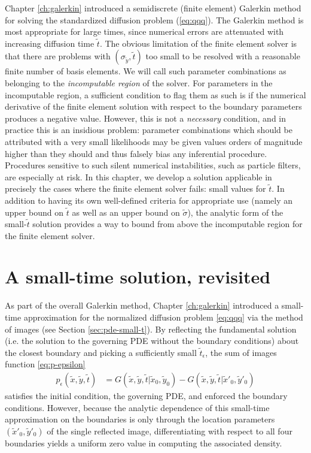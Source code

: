 \label{ch:small-time}

Chapter \ref{ch:galerkin} introduced a semidiscrete (finite element)
Galerkin method for solving the standardized diffusion problem
(\ref{eq:qqq}). The Galerkin method is most appropriate for large
times, since numerical errors are attenuated with increasing diffusion
time $\tilde{t}$. The obvious limitation of the finite element solver
is that there are problems with $(\sigma_{\tilde{y}}, \tilde{t})$ too
small to be resolved with a reasonable finite number of basis
elements. We will call such parameter combinations as belonging to the
\textit{incomputable region} of the solver. For parameters in the
incomputable region, a sufficient condition to flag them as such is if
the numerical derivative of the finite element solution with respect
to the boundary parameters produces a negative value. However, this is
not a \textit{necessary} condition, and in practice this is an
insidious problem: parameter combinations which should be attributed
with a very small likelihoods may be given values orders of magnitude
higher than they should and thus falsely bias any inferential
procedure. Procedures sensitive to such silent numerical
instabilities, such as particle filters, are especially at risk. In
this chapter, we develop a solution applicable in precisely the cases
where the finite element solver fails: small values for
$\tilde{t}$. In addition to having its own well-defined criteria for
appropriate use (namely an upper bound on $\tilde{t}$ as well as an
upper bound on $\tilde{\sigma}$), the analytic form of the
small-$\tilde{t}$ solution provides a way to bound from above the
incomputable region for the finite element solver.


\section{A small-time solution, revisited}
As part of the overall Galerkin method, Chapter \ref{ch:galerkin}
introduced a small-time approximation for the normalized diffusion
problem \eqref{eq:qqq} via the method of images (see Section
\ref{sec:pde-small-t}). By reflecting the fundamental solution
(i.e. the solution to the governing PDE without the boundary conditions) about the
closest boundary and picking a sufficiently small
$\tilde{t}_\epsilon$, the sum of images function \eqref{eq:p-epsilon}
\begin{align*}
  p_\epsilon(\tilde{x}, \tilde{y}, \tilde{t}) &= G(\tilde{x}, \tilde{y}, \tilde{t} | \tilde{x}_0, \tilde{y}_0) - G(\tilde{x}, \tilde{y}, \tilde{t} | \tilde{x}'_0, \tilde{y}'_0)
\end{align*}
satisfies the initial condition, the governing PDE, and enforced the
boundary conditions. However, because the analytic dependence of this
small-time approximation on the boundaries is only through the
location parameters $(\tilde{x}'_0, \tilde{y}'_0)$ of the single
reflected image, differentiating with respect to all four boundaries
yields a uniform zero value in computing the associated density.

